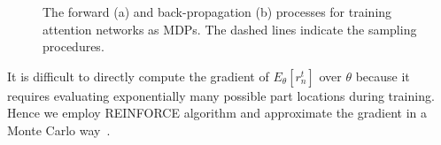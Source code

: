 \documentclass[10pt,twocolumn,letterpaper]{article}
\begin{document}
\begin{figure}[t]
\begin{center}
\hspace{0.05in}
\end{center}
\caption{The forward (a) and back-propagation (b) processes for training attention networks as MDPs.
The dashed lines indicate the sampling procedures.
}
\label{fig:optimization}
\end{figure}

It is difficult to directly compute the gradient of $E_{\theta}[r^t_n]$ over $\theta$ because it requires evaluating exponentially many possible part locations during training.
Hence we employ REINFORCE algorithm and approximate the gradient in a Monte Carlo way~\cite{bd20}.
\end{document}
